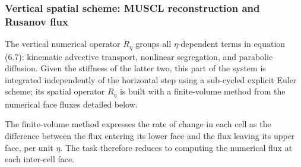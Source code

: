 \documentclass[lineno]{JFM-FLM_Au}
\begin{document}
\subsubsection{Vertical spatial scheme: MUSCL reconstruction and Rusanov flux}
\label{sec:muscl}

The vertical numerical operator $R_\eta$ groups all $\eta$-dependent terms in equation (6.7): kinematic advective transport, nonlinear segregation, and parabolic diffusion. Given the stiffness of the latter two, this part of the system is integrated independently of the horizontal step using a sub-cycled explicit Euler scheme; its spatial operator $R_\eta$ is built with a finite-volume method from the numerical face fluxes detailed below.

The finite-volume method expresses the rate of change in each cell as the difference between the flux entering its lower face and the flux leaving its upper face, per unit $\eta$. The task therefore reduces to computing the numerical flux at each inter-cell face.
\end{document}
